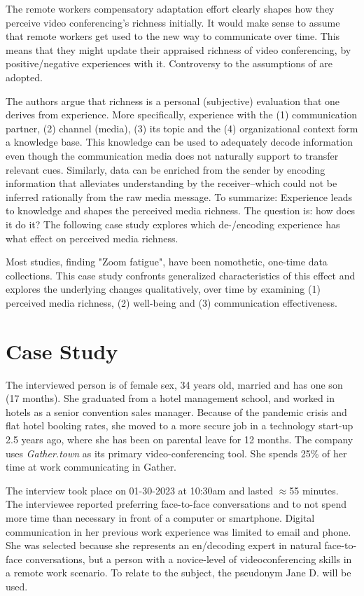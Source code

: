 \documentclass[man]{apa7}
\begin{document}
The remote workers compensatory adaptation effort clearly shapes how they perceive video conferencing's richness initially. It would make sense to assume that remote workers get used to the new way to communicate over time. This means that they might update their appraised richness of video conferencing, by positive/negative experiences with it. Controversy to \citeauthor{daft1983information} the assumptions of \cite{Carlson1999} are adopted.

The authors argue that richness is a personal (subjective) evaluation that one derives from experience. More specifically, experience with the (1) communication partner, (2) channel (media), (3) its topic and the (4) organizational context form a knowledge base. This knowledge can be used to adequately decode information even though the communication media does not naturally support to transfer relevant cues. Similarly, data can be enriched from the sender by encoding information that alleviates understanding by the receiver–which could not be inferred rationally from the raw media message. To summarize: Experience leads to knowledge and shapes the perceived media richness. The question is: how does it do it? The following case study explores which de-/encoding experience has what effect on perceived media richness.

Most studies, finding "Zoom fatigue", have been nomothetic, one-time data collections. This case study confronts generalized characteristics of this effect and explores the underlying changes qualitatively, over time by examining (1) perceived media richness, (2) well-being and (3) communication effectiveness.

\section{Case Study}

The interviewed person is of female sex, 34 years old, married and has one son (17 months). She graduated from a hotel management school, and worked in hotels as a senior convention sales manager. Because of the pandemic crisis and flat hotel booking rates, she moved to a more secure job in a technology start-up 2.5 years ago, where she has been on parental leave for 12 months. The company uses \textit{Gather.town} as its primary video-conferencing tool. She spends 25\% of her time at work communicating in Gather.

The interview took place on 01-30-2023 at 10:30am and lasted $\approx$55 minutes. The interviewee reported preferring face-to-face conversations and to not spend more time than necessary in front of a computer or smartphone. Digital communication in her previous work experience was limited to email and phone. She was selected because she represents an en/decoding expert in natural face-to-face conversations, but a person with a novice-level of videoconferencing skills in a remote work scenario. To relate to the subject, the pseudonym Jane D. will be used.
\end{document}

